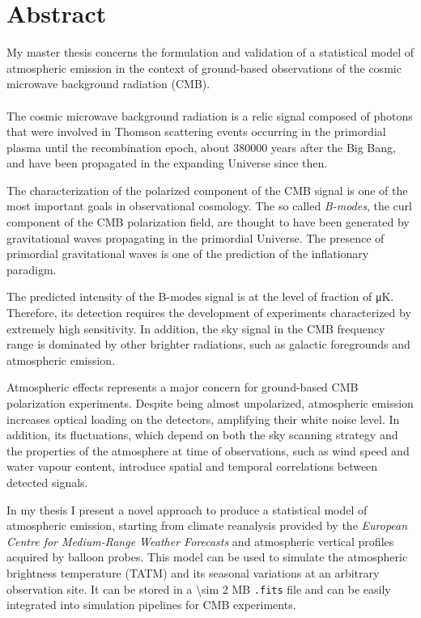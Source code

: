 \documentclass[11pt,letterpaper]{article}
\begin{document}
\section*{\centering Abstract}

My master thesis concerns the formulation and validation of a statistical
model of atmospheric emission in the context of ground-based observations
of the cosmic microwave background radiation (CMB).
\\\\
The cosmic microwave background radiation is a relic signal composed of
photons that were involved in Thomson scattering events occurring in the
primordial plasma until the recombination epoch, about \num{380000} years
after the Big Bang, and have been propagated in the expanding Universe
since then.

The characterization of the polarized component of the CMB signal is one of
the most important goals in observational cosmology. The so called
\emph{B-modes}, the curl component of the CMB polarization field, are
thought to have been generated by gravitational waves propagating in the
primordial Universe. The presence of primordial gravitational waves is one
of the prediction of the inflationary paradigm.

The predicted intensity of the B-modes signal is at the level of fraction
of \si{\micro\kelvin}. Therefore, its detection requires the development of
experiments characterized by extremely high sensitivity. In addition, the
sky signal in the CMB frequency range is dominated by other brighter
radiations, such as galactic foregrounds and atmospheric emission.

Atmospheric effects represents a major concern for ground-based CMB
polarization experiments. Despite being almost unpolarized, atmospheric
emission increases optical loading on the detectors, amplifying their white
noise level. In addition, its fluctuations, which depend on both the sky
scanning strategy and the properties of the atmosphere at time of
observations, such as wind speed and water vapour content, introduce
spatial and temporal correlations between detected signals.

In my thesis I present a novel approach to produce a statistical model of
atmospheric emission, starting from climate reanalysis provided by the
\emph{European Centre for Medium-Range Weather Forecasts} and atmospheric
vertical profiles acquired by balloon probes. This model can be used
to simulate the atmospheric brightness temperature (TATM) and its seasonal
variations at an arbitrary observation site. It can be stored in a
\num{\sim 2} MB \texttt{.fits} file and can be easily integrated into
simulation pipelines for CMB experiments.
\end{document}

